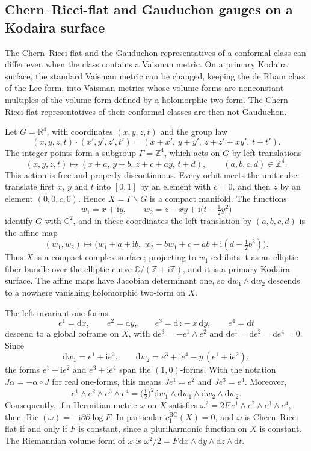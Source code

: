 \subsection{Chern--Ricci-flat and Gauduchon gauges on a Kodaira surface}
\label{subsec:lck-kodaira-gauges}

The Chern--Ricci-flat and the Gauduchon representatives of a conformal class can differ even when the class contains a Vaisman metric. On a primary Kodaira surface, the standard Vaisman metric can be changed, keeping the de Rham class of the Lee form, into Vaisman metrics whose volume forms are nonconstant multiples of the volume form defined by a holomorphic two-form. The Chern--Ricci-flat representatives of their conformal classes are then not Gauduchon.

Let $G=\mathbb R^4$, with coordinates $(x,y,z,t)$ and the group law
\[
 (x,y,z,t)\cdot(x',y',z',t')=(x+x',\,y+y',\,z+z'+xy',\,t+t').
\]
The integer points form a subgroup $\Gamma=\mathbb Z^4$, which acts on $G$ by left translations
\[
 (x,y,z,t)\longmapsto(x+a,\,y+b,\,z+c+ay,\,t+d),\qquad (a,b,c,d)\in\mathbb Z^4.
\]
This action is free and properly discontinuous. Every orbit meets the unit cube: translate first $x$, $y$ and $t$ into $[0,1]$ by an element with $c=0$, and then $z$ by an element $(0,0,c,0)$. Hence $X=\Gamma\backslash G$ is a compact manifold. The functions
\[
 w_1=x+\mathrm iy,\qquad w_2=z-xy+\mathrm i\bigl(t-\tfrac12y^2\bigr)
\]
identify $G$ with $\mathbb C^2$, and in these coordinates the left translation by $(a,b,c,d)$ is the affine map
\[
 (w_1,w_2)\longmapsto\bigl(w_1+a+\mathrm ib,\;w_2-bw_1+c-ab+\mathrm i(d-\tfrac12b^2)\bigr).
\]
Thus $X$ is a compact complex surface; projecting to $w_1$ exhibits it as an elliptic fiber bundle over the elliptic curve $\mathbb C/(\mathbb Z+\mathrm i\mathbb Z)$, and it is a primary Kodaira surface. The affine maps have Jacobian determinant one, so $\mathrm dw_1\wedge\mathrm dw_2$ descends to a nowhere vanishing holomorphic two-form on $X$.

The left-invariant one-forms
\[
 e^1=\mathrm dx,\qquad e^2=\mathrm dy,\qquad e^3=\mathrm dz-x\,\mathrm dy,\qquad e^4=\mathrm dt
\]
descend to a global coframe on $X$, with $\mathrm de^3=-e^1\wedge e^2$ and $\mathrm de^1=\mathrm de^2=\mathrm de^4=0$. Since
\[
 \mathrm dw_1=e^1+\mathrm ie^2,\qquad
 \mathrm dw_2=e^3+\mathrm ie^4-y\,(e^1+\mathrm ie^2),
\]
the forms $e^1+\mathrm ie^2$ and $e^3+\mathrm ie^4$ span the $(1,0)$-forms. With the notation $J\alpha=-\alpha\circ J$ for real one-forms, this means $Je^1=e^2$ and $Je^3=e^4$. Moreover,
\[
 e^1\wedge e^2\wedge e^3\wedge e^4
 =\bigl(\tfrac{\mathrm i}{2}\bigr)^2\mathrm dw_1\wedge\mathrm d\bar w_1\wedge\mathrm dw_2\wedge\mathrm d\bar w_2.
\]
Consequently, if a Hermitian metric $\omega$ on $X$ satisfies $\omega^2=2F\,e^1\wedge e^2\wedge e^3\wedge e^4$, then $\operatorname{Ric}(\omega)=-\mathrm i\partial\bar\partial\log F$. In particular $c_1^{\mathrm{BC}}(X)=0$, and $\omega$ is Chern--Ricci flat if and only if $F$ is constant, since a pluriharmonic function on $X$ is constant. The Riemannian volume form of $\omega$ is $\omega^2/2=F\,\mathrm dx\wedge\mathrm dy\wedge\mathrm dz\wedge\mathrm dt$.

